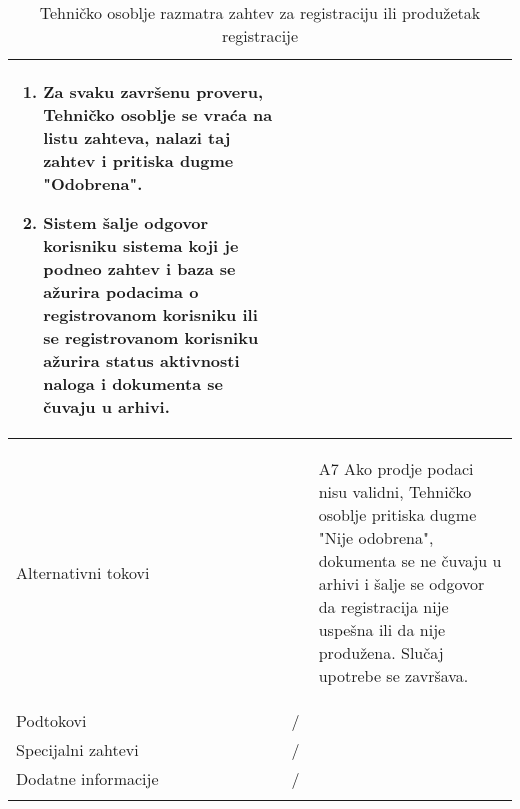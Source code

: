 \documentclass{article}
\begin{document}
\begin{longtable}{| p{} | p{} |}
\begin{enumerate}
                    \item Za svaku završenu proveru, Tehničko osoblje se vraća na listu zahteva, nalazi taj zahtev i pritiska dugme "Odobrena".
                    \item Sistem šalje odgovor korisniku sistema koji je podneo zahtev i baza se ažurira podacima o registrovanom korisniku ili se registrovanom korisniku ažurira status aktivnosti naloga i dokumenta se čuvaju u arhivi. 
                \end{enumerate}\\
            \hline
                Alternativni tokovi & 
                \begin{enumerate}
                    \item[A7] Ako prodje podaci nisu validni, Tehničko osoblje pritiska dugme "Nije odobrena", dokumenta se ne čuvaju u arhivi i šalje se odgovor da registracija nije uspešna ili da nije produžena. Slučaj upotrebe se završava.
                \end{enumerate}\\
            \hline
                Podtokovi & /\\
            \hline
                Specijalni zahtevi & /\\
            \hline
                Dodatne informacije & / \\
            \hline
            \caption{Tehničko osoblje razmatra zahtev za registraciju ili produžetak registracije}
        \end{longtable}
\end{document}
